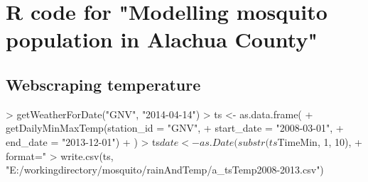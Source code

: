 \documentclass{article}
\begin{document}


\section*{R code for "Modelling mosquito population in Alachua County"}

\subsection*{Webscraping temperature}


\begin{Schunk}
\begin{Sinput}
> getWeatherForDate("GNV", "2014-04-14")
> ts <- as.data.frame(
+   getDailyMinMaxTemp(station_id = "GNV", 
+                    start_date = "2008-03-01",
+                    end_date = "2013-12-01")
+ )
> ts$date <- as.Date(substr(ts$TimeMin, 1, 10), 
+                    format="%Y-%m-%d")
> write.csv(ts, "E:/workingdirectory/mosquito/rainAndTemp/a_tsTemp2008-2013.csv")
\end{Sinput}
\end{Schunk}

\newpage
\end{document}
